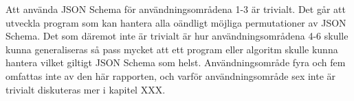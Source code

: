 \noindent
Att använda JSON Schema för användningsområdena 1-3 är trivialt. Det går att utveckla program som kan hantera alla oändligt möjliga permutationer av JSON Schema. Det som däremot inte är trivialt är hur användningsområdena 4-6 skulle kunna generaliseras så pass mycket att ett program eller algoritm skulle kunna hantera vilket giltigt JSON Schema som helst. Användningsområde fyra och fem omfattas inte av den här rapporten, och varför användningsområde sex inte är trivialt diskuteras mer i kapitel XXX.


